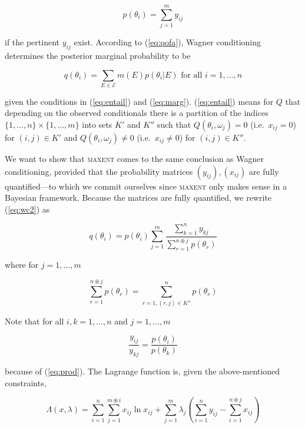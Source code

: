 \documentclass[11pt]{article}
\begin{document}
\begin{equation}
  \label{eq:wc1}
  p(\theta_{i})=\sum_{j=1}^{m}y_{ij}
\end{equation}

if the pertinent $y_{ij}$ exist. According to (\ref{eq:qofa}), Wagner
conditioning determines the posterior marginal probability to be

\begin{equation}
  \label{eq:wc2}
    q(\theta_{i})=\sum_{E\in\mathcal{E}}m(E)p(\theta_{i}|E)\mbox{ for
      all }i=1,\ldots,n
\end{equation}

given the conditions in (\ref{eq:entail}) and (\ref{eq:marg}).
(\ref{eq:entail}) means for $Q$ that depending on the observed
conditionals there is a partition of the indices
$\{1,\ldots,n\}\times\{1,\ldots,m\}$ into sets $K'$ and $K''$ such
that $Q(\theta_{i},\omega_{j})=0$ (i.e.\ $x_{ij}=0$) for
$(i,j)\in{}K'$ and $Q(\theta_{i},\omega_{j})\neq{}0$ (i.e.\
$x_{ij}\neq{}0$) for $(i,j)\in{}K''$.

We want to show that \textsc{maxent} comes to the same conclusion as
Wagner conditioning, provided that the probability matrices
$(y_{ij}),(x_{ij})$ are fully quantified---to which we commit
ourselves since \textsc{maxent} only makes sense in a Bayesian
framework. Because the matrices are fully quantified, we rewrite
(\ref{eq:wc2}) as

\begin{equation}
  \label{eq:wc3}
  q(\theta_{i})=p(\theta_{i})\sum_{j=1}^{m}\frac{\sum_{k=1}^{n}y_{kj}}{\sum_{r=1}^{n\circledast{}j}p(\theta_{r})}
\end{equation}

where for $j=1,\ldots,m$

\begin{equation}
  \label{eq:dast}
  \sum_{r=1}^{n\circledast{}j}p(\theta_{r})=\sum_{r=1,(r,j)\in{}K''}^{n}p(\theta_{r})
\end{equation}

Note that for all $i,k=1,\ldots,n$ and $j=1,\ldots,m$

\begin{equation}
  \label{eq:wc4}
  \frac{y_{ij}}{y_{kj}}=\frac{p(\theta_{i})}{p(\theta_{k})}
\end{equation}

because of (\ref{eq:prod}). The Lagrange function is, given the
above-mentioned constraints,

\begin{equation}
  \label{eq:wclag}
  \Lambda(x,\lambda)=\sum_{i=1}^{n}\sum_{j=1}^{m\circledast{}i}x_{ij}\ln{}x_{ij}+\sum_{j=1}^{m}\lambda_{j}\left(\sum_{i=1}^{n}y_{ij}-\sum_{i=1}^{n\circledast{}j}x_{ij}\right)
\end{equation}
\end{document}
